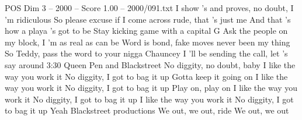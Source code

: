 \begin{textsample}{POS Dim 3 – 2000 – Score 1.00 – 2000/091.txt}
I show 's and proves, no doubt, I 'm ridiculous So please excuse if I come across rude, that 's just me And that 's how a playa 's got to be Stay kicking game with a capital G Ask the people on my block, I 'm as real as can be Word is bond, fake moves never been my thing So Teddy, pass the word to your nigga Chauncey I 'll be sending the call, let 's say around 3:30 Queen Pen and Blackstreet No diggity, no doubt, baby I like the way you work it No diggity, I got to bag it up Gotta keep it going on I like the way you work it No diggity, I got to bag it up Play on, play on I like the way you work it No diggity, I got to bag it up I like the way you work it No diggity, I got to bag it up Yeah Blackstreet productions We out, we out, ride We out, we out

\end{textsample}
